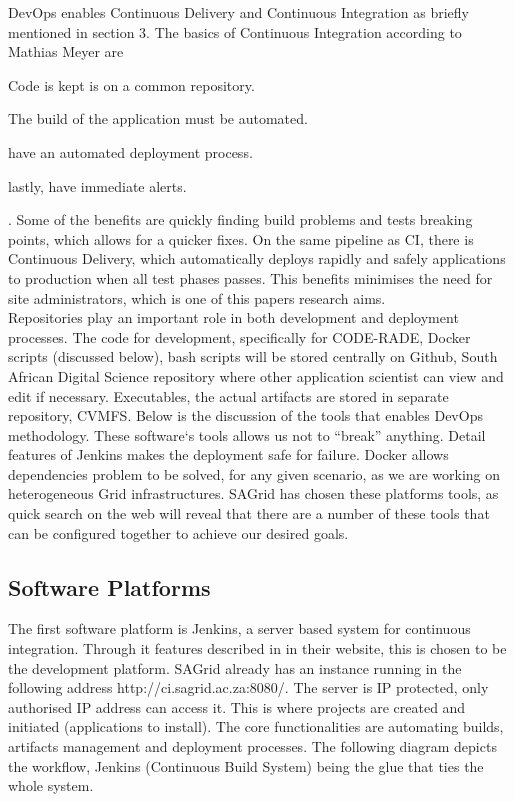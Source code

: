 \documentclass [titlepage,11pt]{article}
\begin{document}
DevOps enables Continuous Delivery \cite{delivery15} and Continuous Integration \citep{fowler06} as briefly mentioned in section 3. The basics of Continuous Integration according to Mathias Meyer are  
\begin{enumerate*}[label=\itshape\alph*\upshape)]
\item Code is kept is on a common repository.
\item The build of the application must be automated.
\item have an automated deployment process. 
\item lastly, have immediate alerts.
\end{enumerate*} \citep{meyer14}. Some of the benefits are quickly finding build problems and tests breaking points, which allows for a quicker fixes. On the same pipeline as CI, there is Continuous Delivery, which automatically deploys rapidly and safely applications to production when all test phases passes. This benefits minimises the need for site administrators, which is one of this papers research aims. \\

Repositories play an important role in both development and deployment processes. The code for development, specifically for CODE-RADE, Docker scripts (discussed below), bash scripts will be stored centrally on Github, South African Digital Science repository \citep{github} where other application scientist can view and edit if necessary. Executables, the actual artifacts are stored in separate repository, CVMFS. Below is the discussion of the tools that enables DevOps methodology. These software`s tools allows us not to ``break'' anything. Detail features of Jenkins makes the deployment safe for failure. Docker allows dependencies problem to be solved, for any given scenario, as we are working on heterogeneous Grid infrastructures. SAGrid has chosen these platforms tools, as quick search on the web will reveal that there are a number of these tools that can be configured together to achieve our desired goals. \\

\subsection{Software Platforms}
The first software platform is Jenkins, a server based system for continuous integration. Through it features described in \citep{jenkins15} in their website, this is chosen to be the development platform. SAGrid already has an instance running in the following address http://ci.sagrid.ac.za:8080/. The server is IP protected, only authorised IP address can access it.  This is where projects are created and initiated (applications to install). The core functionalities are automating builds, artifacts management and deployment processes. The following diagram depicts the workflow, Jenkins (Continuous Build System) being the glue that ties the whole system.
\end{document}
